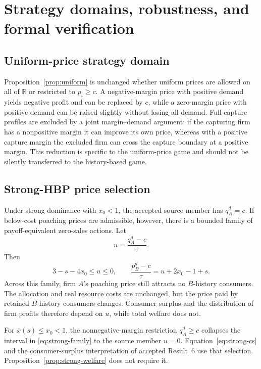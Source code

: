 \section{Strategy domains, robustness, and formal verification}
\label{sec:scope}

\subsection{Uniform-price strategy domain}

Proposition~\ref{prop:uniform} is unchanged whether uniform prices are allowed on all of \(\mathbb R\) or restricted to \(p_i\ge c\). A negative-margin price with positive demand yields negative profit and can be replaced by \(c\), while a zero-margin price with positive demand can be raised slightly without losing all demand. Full-capture profiles are excluded by a joint margin--demand argument: if the capturing firm has a nonpositive margin it can improve its own price, whereas with a positive capture margin the excluded firm can cross the capture boundary at a positive margin. This reduction is specific to the uniform-price game and should not be silently transferred to the history-based game.

\subsection{Strong-HBP price selection}

Under strong dominance with \(x_0<1\), the accepted source member has \(q_A^d=c\). If below-cost poaching prices are admissible, however, there is a bounded family of payoff-equivalent zero-sales actions. Let
\[
u=\frac{q_A^d-c}{\tau}.
\]
Then
\begin{equation}
3-s-4x_0\le u\le0,
\qquad
\frac{p_B^d-c}{\tau}=u+2x_0-1+s.
\label{eq:strong-family}
\end{equation}
Across this family, firm \(A\)'s poaching price still attracts no \(B\)-history consumers. The allocation and real resource costs are unchanged, but the price paid by retained \(B\)-history consumers changes. Consumer surplus and the distribution of firm profits therefore depend on \(u\), while total welfare does not.

For \(\bar x(s)\le x_0<1\), the nonnegative-margin restriction \(q_A^d\ge c\) collapses the interval in \eqref{eq:strong-family} to the source member \(u=0\). Equation~\eqref{eq:strong-cs} and the consumer-surplus interpretation of accepted Result~6 use that selection. Proposition~\ref{prop:strong-welfare} does not require it.

